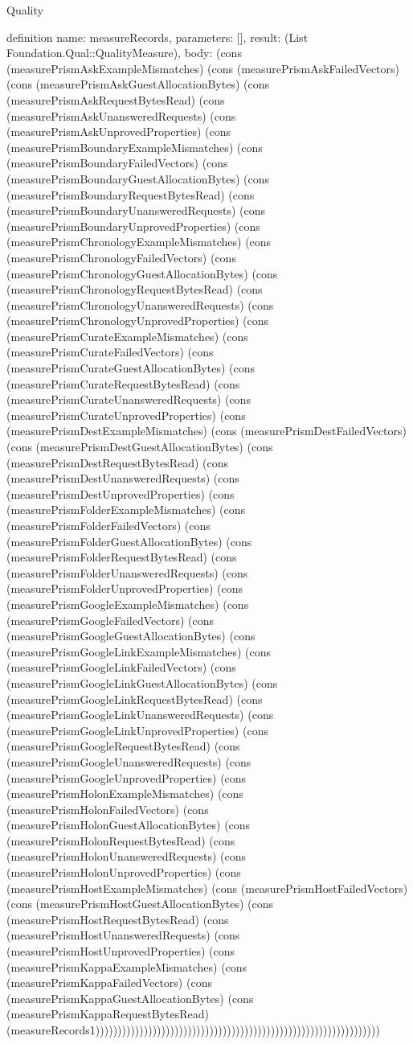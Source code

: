 \begin{lexlean}{Quality}
\begin{semanticmodule}
definition{
  name: measureRecords,
  parameters: [],
  result: (List Foundation.Qual::QualityMeasure),
  body: (cons (measurePrismAskExampleMismatches) (cons (measurePrismAskFailedVectors) (cons (measurePrismAskGuestAllocationBytes) (cons (measurePrismAskRequestBytesRead) (cons (measurePrismAskUnansweredRequests) (cons (measurePrismAskUnprovedProperties) (cons (measurePrismBoundaryExampleMismatches) (cons (measurePrismBoundaryFailedVectors) (cons (measurePrismBoundaryGuestAllocationBytes) (cons (measurePrismBoundaryRequestBytesRead) (cons (measurePrismBoundaryUnansweredRequests) (cons (measurePrismBoundaryUnprovedProperties) (cons (measurePrismChronologyExampleMismatches) (cons (measurePrismChronologyFailedVectors) (cons (measurePrismChronologyGuestAllocationBytes) (cons (measurePrismChronologyRequestBytesRead) (cons (measurePrismChronologyUnansweredRequests) (cons (measurePrismChronologyUnprovedProperties) (cons (measurePrismCurateExampleMismatches) (cons (measurePrismCurateFailedVectors) (cons (measurePrismCurateGuestAllocationBytes) (cons (measurePrismCurateRequestBytesRead) (cons (measurePrismCurateUnansweredRequests) (cons (measurePrismCurateUnprovedProperties) (cons (measurePrismDestExampleMismatches) (cons (measurePrismDestFailedVectors) (cons (measurePrismDestGuestAllocationBytes) (cons (measurePrismDestRequestBytesRead) (cons (measurePrismDestUnansweredRequests) (cons (measurePrismDestUnprovedProperties) (cons (measurePrismFolderExampleMismatches) (cons (measurePrismFolderFailedVectors) (cons (measurePrismFolderGuestAllocationBytes) (cons (measurePrismFolderRequestBytesRead) (cons (measurePrismFolderUnansweredRequests) (cons (measurePrismFolderUnprovedProperties) (cons (measurePrismGoogleExampleMismatches) (cons (measurePrismGoogleFailedVectors) (cons (measurePrismGoogleGuestAllocationBytes) (cons (measurePrismGoogleLinkExampleMismatches) (cons (measurePrismGoogleLinkFailedVectors) (cons (measurePrismGoogleLinkGuestAllocationBytes) (cons (measurePrismGoogleLinkRequestBytesRead) (cons (measurePrismGoogleLinkUnansweredRequests) (cons (measurePrismGoogleLinkUnprovedProperties) (cons (measurePrismGoogleRequestBytesRead) (cons (measurePrismGoogleUnansweredRequests) (cons (measurePrismGoogleUnprovedProperties) (cons (measurePrismHolonExampleMismatches) (cons (measurePrismHolonFailedVectors) (cons (measurePrismHolonGuestAllocationBytes) (cons (measurePrismHolonRequestBytesRead) (cons (measurePrismHolonUnansweredRequests) (cons (measurePrismHolonUnprovedProperties) (cons (measurePrismHostExampleMismatches) (cons (measurePrismHostFailedVectors) (cons (measurePrismHostGuestAllocationBytes) (cons (measurePrismHostRequestBytesRead) (cons (measurePrismHostUnansweredRequests) (cons (measurePrismHostUnprovedProperties) (cons (measurePrismKappaExampleMismatches) (cons (measurePrismKappaFailedVectors) (cons (measurePrismKappaGuestAllocationBytes) (cons (measurePrismKappaRequestBytesRead) (measureRecords1)))))))))))))))))))))))))))))))))))))))))))))))))))))))))))))))))
}


\end{semanticmodule}
\end{lexlean}

